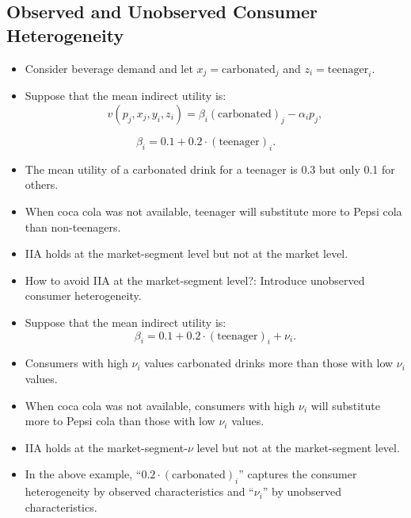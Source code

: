 \documentclass[
]{book}
\providecommand{\tightlist}{%
  \setlength{\itemsep}{0pt}\setlength{\parskip}{0pt}}
\begin{document}
\hypertarget{observed-and-unobserved-consumer-heterogeneity}{%
\subsection{Observed and Unobserved Consumer Heterogeneity}\label{observed-and-unobserved-consumer-heterogeneity}}

\begin{itemize}
\tightlist
\item
  Consider beverage demand and let \(x_j = \text{carbonated}_j\) and \(z_i = \text{teenager}_i\).
\item
  Suppose that the mean indirect utility is:
  \begin{equation}
  v(p_j, x_j, y_i, z_i) = \beta_i (\text{carbonated})_j - \alpha_i p_j,
  \end{equation}
\end{itemize}

\begin{equation}
\beta_i = 0.1 + 0.2 \cdot (\text{teenager})_i.
\end{equation}

\begin{itemize}
\item
  The mean utility of a carbonated drink for a teenager is 0.3 but only 0.1 for others.
\item
  When coca cola was not available, teenager will substitute more to Pepsi cola than non-teenagers.
\item
  IIA holds at the market-segment level but not at the market level.
\item
  How to avoid IIA at the market-segment level?: Introduce unobserved consumer heterogeneity.
\item
  Suppose that the mean indirect utility is:
  \begin{equation}
  \beta_i = 0.1 + 0.2 \cdot (\text{teenager})_i + \nu_i.
  \end{equation}
\item
  Consumers with high \(\nu_i\) values carbonated drinks more than those with low \(\nu_i\) values.
\item
  When coca cola was not available, consumers with high \(\nu_i\) will substitute more to Pepsi cola than those with low \(\nu_i\) values.
\item
  IIA holds at the market-segment-\(\nu\) level but not at the market-segment level.
\item
  In the above example, ``\(0.2 \cdot (\text{carbonated})_i\)'' captures the consumer heterogeneity by observed characteristics and ``\(\nu_i\)'' by unobserved characteristics.
\end{itemize}
\end{document}
